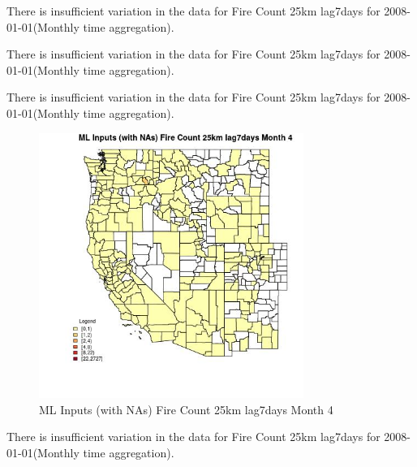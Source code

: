 There is insufficient variation in the data for Fire Count 25km lag7days for 2008-01-01(Monthly time aggregation). 
 

There is insufficient variation in the data for Fire Count 25km lag7days for 2008-01-01(Monthly time aggregation). 
 

There is insufficient variation in the data for Fire Count 25km lag7days for 2008-01-01(Monthly time aggregation). 
 

\begin{figure} 
\centering  
\includegraphics[width=0.77\textwidth]{Code_Outputs/Report_ML_input_PM25_Step4_part_f_de_duplicated_aveswNAs_CountyFire_Count_25km_lag7daysmedianMonth4.jpg} 
\caption{\label{fig:Report_ML_input_PM25_Step4_part_f_de_duplicated_aveswNAsCountyFire_Count_25km_lag7daysmedianMonth4}ML Inputs (with NAs) Fire Count 25km lag7days Month 4} 
\end{figure} 
 

There is insufficient variation in the data for Fire Count 25km lag7days for 2008-01-01(Monthly time aggregation). 
 

